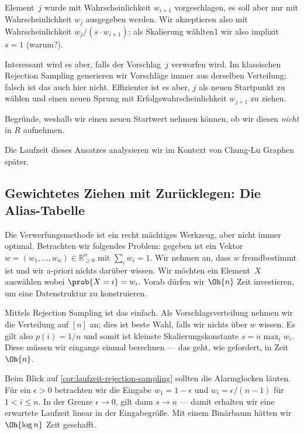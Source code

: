 Element~$j$ wurde mit Wahrscheinlichkeit $w_{i+1}$ vorgeschlagen, es soll aber nur mit Wahrscheinlichkeit $w_j$ ausgegeben werden.
Wir akzeptieren also mit Wahrscheinlichkeit $w_{j} / (s \cdot w_{i+1})$; als Skalierung wählten1 wir also implizit $s=1$ (warum?).

Interessant wird es aber, falls der Vorschlag~$j$ verworfen wird.
Im klassischen Rejection Sampling generieren wir Vorschläge immer aus derselben Verteilung; falsch ist das auch hier nicht.
Effizienter ist es aber, $j$ als neuen Startpunkt zu wählen und einen neuen Sprung mit Erfolgswahrscheinlichkeit $w_{j+1}$ zu ziehen.

\begin{exercise}
    Begründe, weshalb wir einen neuen Startwert nehmen können, ob wir diesen \emph{nicht} in $R$ aufnehmen.
\end{exercise}

Die Laufzeit dieses Ansatzes analysieren wir im Kontext von Chung-Lu Graphen später.

\subsection{Gewichtetes Ziehen mit Zurücklegen: Die Alias-Tabelle}\label{subsec:alias1}
Die Verwerfungsmethode ist ein recht mächtiges Werkzeug, aber nicht immer optimal.
Betrachten wir folgendes Problem:
gegeben ist ein Vektor $w = (w_1, \ldots, w_n) \in \mathbb R_{\ge 0}^n$ mit $\sum_i w_i = 1$.
Wir nehmen an, dass $w$ fremdbestimmt ist und wir a-priori nichts darüber wissen.
Wir möchten ein Element~$X$ auswählen wobei $\prob{X = i} = w_i$.
Vorab dürfen wir $\Oh{n}$ Zeit investieren, um eine Datenstruktur zu konstruieren.

Mittels Rejection Sampling ist das einfach.
Als Vorschlagsverteilung nehmen wir die Verteilung auf $[n]$ an; dies ist beste Wahl, falls wir nichts über $w$ wissen.
Es gilt also $p(i) = 1/n$ und somit ist kleinste Skalierungskonstante $s = n \max_i{w_i}$.
Diese müssen wir eingangs einmal berechnen --- das geht, wie gefordert, in Zeit $\Oh{n}$.

Beim Blick auf \cref{cor:laufzeit-rejection-sampling} sollten die Alarmglocken läuten.
Für ein $\epsilon > 0$ betrachten wir die Eingabe $w_1 = 1 - \epsilon$ und $w_i = \epsilon / (n - 1)$ für $1 < i \le n$.
In der Grenze $\epsilon \to 0$, gilt dann $s \to n$  --- damit erhalten wir eine erwartete Laufzeit linear in der Eingabegröße.
Mit einem Binärbaum hätten wir $\Oh{\log n}$ Zeit geschafft.

